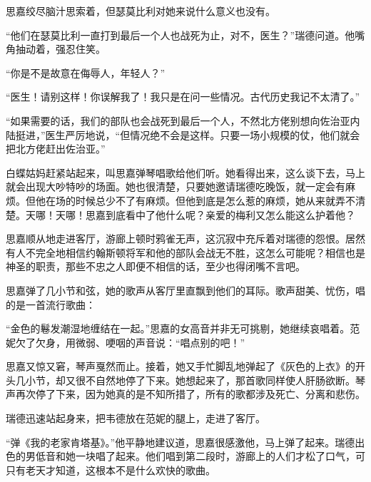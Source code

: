 \par 思嘉绞尽脑汁思索着，但瑟莫比利对她来说什么意义也没有。
\par “他们在瑟莫比利一直打到最后一个人也战死为止，对不，医生？”瑞德问道。他嘴角抽动着，强忍住笑。
\par “你是不是故意在侮辱人，年轻人？”
\par “医生！请别这样！你误解我了！我只是在问一些情况。古代历史我记不太清了。”
\par “如果需要的话，我们的部队也会战死到最后一个人，不然北方佬别想向佐治亚内陆挺进，”医生严厉地说，“但情况绝不会是这样。只要一场小规模的仗，他们就会把北方佬赶出佐治亚。”
\par 白蝶姑妈赶紧站起来，叫思嘉弹琴唱歌给他们听。她看得出来，这么谈下去，马上就会出现大吵特吵的场面。她也很清楚，只要她邀请瑞德吃晚饭，就一定会有麻烦。但他在场的时候总少不了有麻烦。但他到底是怎么惹的麻烦，她从来就弄不清楚。天哪！天哪！思嘉到底看中了他什么呢？亲爱的梅利又怎么能这么护着他？
\par 思嘉顺从地走进客厅，游廊上顿时鸦雀无声，这沉寂中充斥着对瑞德的怨恨。居然有人不完全地相信约翰斯顿将军和他的部队会战无不胜，这怎么可能呢？相信也是神圣的职责，那些不忠之人即便不相信的话，至少也得闭嘴不言吧。
\par 思嘉弹了几小节和弦，她的歌声从客厅里直飘到他们的耳际。歌声甜美、忧伤，唱的是一首流行歌曲：
\par “金色的鬈发潮湿地缠结在一起。”思嘉的女高音并非无可挑剔，她继续哀唱着。范妮欠了欠身，用微弱、哽咽的声音说：“唱点别的吧！”
\par 思嘉又惊又窘，琴声戛然而止。接着，她又手忙脚乱地弹起了《灰色的上衣》的开头几小节，却又很不自然地停了下来。她想起来了，那首歌同样使人肝肠欲断。琴声再次停了下来，因为她真的是不知所措了，所有的歌都涉及死亡、分离和悲伤。
\par 瑞德迅速站起身来，把韦德放在范妮的腿上，走进了客厅。
\par “弹《我的老家肯塔基》。”他平静地建议道，思嘉很感激他，马上弹了起来。瑞德出色的男低音和她一块唱了起来。他们唱到第二段时，游廊上的人们才松了口气，可只有老天才知道，这根本不是什么欢快的歌曲。
